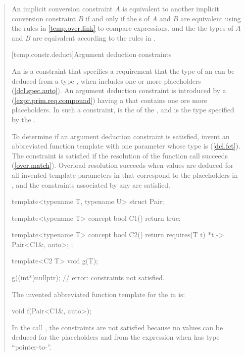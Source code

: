 \begin{quote}
\pnum
An implicit conversion constraint $A$ is equivalent to another implicit 
conversion constraint $B$ if and only if the s 
of $A$ and $B$ are equivalent using the rules in
\ref{temp.over.link} to compare expressions, and the the types
of $A$ and $B$ are equivalent according to the rules in
.


[temp.constr.deduct]{Argument deduction constraints}

\pnum
An  is a constraint that specifies 
a requirement that the type of an  
can be deduced from a type , when  includes one or more 
placeholders (\ref{dcl.spec.auto}).
% 
\enternote
An argument deduction constraint is introduced by a
 (\ref{expr.prim.req.compound}) having a
 that contains one ore more placeholders.
% 
In such a constraint,  is the  of the 
, and  is the type specified
by the .
\exitnote

\pnum
To determine if an argument deduction constraint is satisfied, invent
an abbreviated function template  with one parameter whose
type is  (\ref{dcl.fct}). 
% 
The constraint is satisfied if the resolution of the function call 
 succeeds (\ref{over.match}).
% 
\enternote
Overload resolution succeeds when values are deduced for all invented
template parameters in  that correspond to the placeholders in 
, and the constraints associated by any 
 are satisfied.
\exitnote
% 
\enterexample
\begin{codeblock}
template<typename T, typename U> struct Pair;

template<typename T>
  concept bool C1() { return true; }

template<typename T>
  concept bool C2() { return requires(T t) { {*t} -> Pair<C1&, auto>; }; }

template<C2 T> void g(T);

g((int*)nullptr); // error: constraints not satisfied.
\end{codeblock}
The invented abbreviated function template  for the 
 in  is:
\begin{codeblock}
void f(Pair<C1&, auto>);
\end{codeblock}
In the call , the constraints are not satisfied 
because no values can be deduced for the placeholders  and 
 from the expression  when  has type
``pointer-to-''.
\exitexample


\end{quote}
